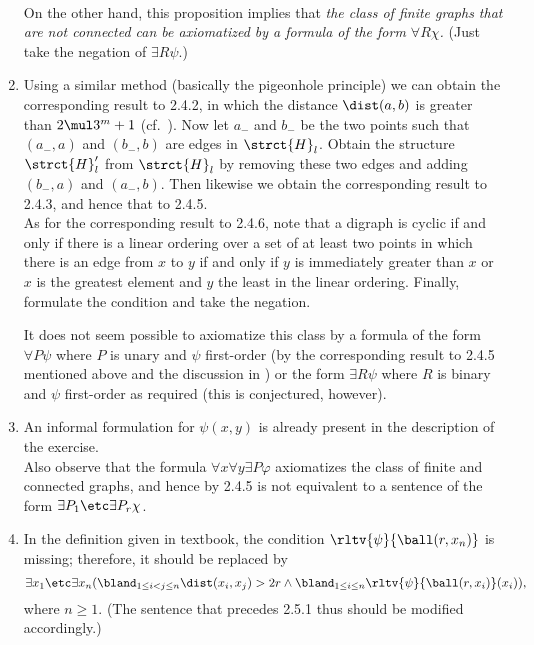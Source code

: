 \begin{enumerate}[1.]
\medskip\\
On the other hand, this proposition implies that \emph{the class of finite graphs that are not connected can be axiomatized by a formula of the form $\forall R \chi$.} (Just take the negation of $\exists R \psi$.)
%
\item {} Using a similar method (basically the pigeonhole principle) we can obtain the corresponding result to 2.4.2, in which the distance $\dist(a, b)$ is greater than $2 \mul 3^m + 1$ (cf.\ ). Now let $a_-$ and $b_-$ be the two points such that $(a_-, a)$ and $(b_-, b)$ are edges in $\strct{H}_l$. Obtain the structure $\strct{H}_l^\prime$ from $\strct{H}_l$ by removing these two edges and adding $(b_-, a)$ and $(a_-, b)$. Then likewise we obtain the corresponding result to 2.4.3, and hence that to 2.4.5.
\medskip\\
As for the corresponding result to 2.4.6, note that a digraph is cyclic if and only if there is a linear ordering over a set of at least two points in which there is an edge from $x$ to $y$ if and only if $y$ is immediately greater than $x$ or $x$ is the greatest element and $y$ the least in the linear ordering. Finally, formulate the condition and take the negation.
\begin{note}
It does not seem possible to axiomatize this class by a formula of the form $\forall P \psi$ where $P$ is unary and $\psi$ first-order (by the corresponding result to 2.4.5 mentioned above and the discussion in ) or the form $\exists R \psi$ where $R$ is binary and $\psi$ first-order as required (this is conjectured, however).
\end{note}
%
\item {} An informal formulation for $\psi(x, y)$ is already present in the description of the exercise.
\medskip\\
Also observe that the formula $\forall x \forall y \exists P \varphi$ axiomatizes the class of finite and connected graphs, and hence by 2.4.5 is not equivalent to a sentence of the form $\exists P_1 \etc \exists P_r \chi$.
%
\item {} In the definition given in textbook, the condition $\rltv{\psi}{\ball(r, x_n)}$ is missing; therefore, it should be replaced by
\[
\exists x_1 \etc \exists x_n (\bland_{1 \leq i < j \leq n}\dist(x_i, x_j) > 2r \land \bland_{1 \leq i \leq n} \rltv{\psi}{\ball(r, x_i)}(x_i)),
\]
where $n \geq 1$. (The sentence that precedes 2.5.1 thus should be modified accordingly.)
%
\end{enumerate}


